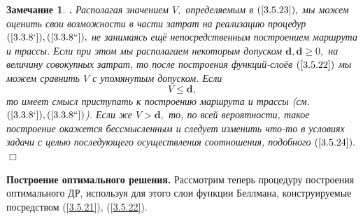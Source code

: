 \documentclass[12pt]{report}
\newcommand{\bfn}{\begin{equation}}
\newcommand{\efn}{\end{equation}}
\newcounter{theo}
\newcounter{zam}
\newtheorem{zam}{Замечание}[section]
\newcommand{\TL}{\mbox{\bf{$\!\!$.}}}
\begin{document}
{\begin{zam}\label{z3.5.1}{\TL} Располагая значением $V,$ определяемым в $(\ref{3.5.23}),$
мы можем оценить свои возможности в части затрат на реализацию процедур $(\ref{3.3.8`}),
(\ref{3.3.8``}),$ не занимаясь ещё непосредственным построением маршрута и трассы. Если при
этом мы располагаем некоторым допуском $\mathbf{d}, \mathbf{d}\geqslant 0,$ на величину
совокупных затрат, то после построения функций-слоёв $(\ref{3.5.22})$ мы можем сравнить $V$
с упомянутым допуском. Если
\bfn\label{3.5.24}V \leqslant \mathbf{d},
\efn
то имеет смысл приступать к построению маршрута и трассы (см. $(\ref{3.3.8`}),
(\ref{3.3.8``})$). Если же $V > \mathbf{d},$ то, по всей вероятности, такое построение
окажется бессмысленным и следует изменить что-то в условиях задачи с целью последующего
осуществления соотношения, подобного $(\ref{3.5.24}).$
\hfill $\Box$ \end{zam}

{\bf Построение оптимального решения.} Рассмотрим теперь процедуру построения оптимального
ДР, используя для этого слои функции Беллмана, конструируемые посредством (\ref{3.5.21}),
(\ref{3.5.22}).

}
\end{document}
